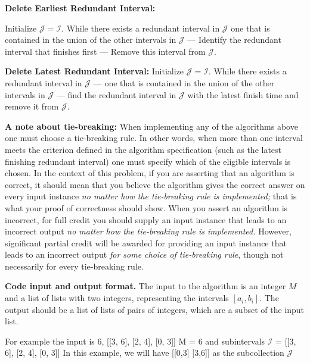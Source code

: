 \documentclass{hw}
\newcommand{\io}{\textbf{Code input and output format.} }
\begin{document}
\begin{problem}
  \begin{subproblem}
    \textbf{Delete Earliest Redundant Interval:}

  Initialize $\mathcal{J}=\mathcal{I}$. While there
  exists a redundant interval in $\mathcal{J}$ one
  that is contained in the union of the other intervals
  in $\mathcal{J}$ --- Identify the redundant interval that finishes first --- Remove this interval from $\mathcal{J}$.

\end{subproblem}

\begin{subproblem}
    \textbf{Delete Latest Redundant Interval:}
  Initialize $\mathcal{J}=\mathcal{I}$. While there
  exists a redundant interval in $\mathcal{J}$ --- one
  that is contained in the union of the other intervals
  in $\mathcal{J}$ --- find the redundant interval in
  $\mathcal{J}$ with the latest finish time and remove it
  from $\mathcal{J}$.
\end{subproblem}

{\bf A note about tie-breaking:}
When implementing any of the algorithms above one must
choose a tie-breaking rule. In other words, when more than
one interval meets the criterion defined in the algorithm
specification (such as the latest finishing redundant
interval) one must specify which of the eligible
intervals is chosen. In the context of this problem,
if you are asserting that an algorithm is correct,
it should mean that you believe the algorithm gives
the correct answer on every input instance
{\em no matter how the tie-breaking rule is implemented;}
that is what your proof of correctness should show.
When you assert an algorithm is incorrect,
for full credit you should supply an input instance
that leads to an incorrect output {\em no matter how
the tie-breaking rule is implemented.} However,
significant partial credit will be awarded for
providing an input instance that leads to an incorrect
output {\em for some choice of tie-breaking rule},
though not necessarily for every tie-breaking rule.

\io The input to the algorithm is an integer $M$
and a list of lists with two integers, representing the
intervals $[a_i, b_i]$. The output should be a list of lists
of pairs of integers, which are a subset of the input list. 

For example the input is 6, [[3, 6], [2, 4], [0, 3]]
M = 6
and subintervals $\mathcal{I}$ = [[3, 6], [2, 4], [0, 3]]
In this example, we will have [[0,3] [3,6]] as the subcollection $\mathcal{J}$


\end{problem}
\end{document}
